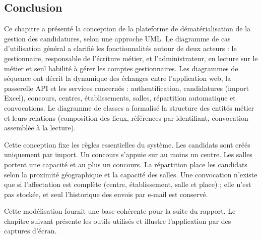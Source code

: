 \begin{onehalfspace}
\section{Conclusion}

Ce chapitre a présenté la conception de la plateforme de dématérialisation de la gestion des candidatures, selon une approche UML. Le diagramme de cas d'utilisation général a clarifié les fonctionnalités autour de deux acteurs : le gestionnaire, responsable de l'écriture métier, et l'administrateur, en lecture sur le métier et seul habilité à gérer les comptes gestionnaires. Les diagrammes de séquence ont décrit la dynamique des échanges entre l'application web, la passerelle API et les services concernés : authentification, candidatures (import Excel), concours, centres, établissements, salles, répartition automatique et convocations. Le diagramme de classes a formalisé la structure des entités métier et leurs relations (composition des lieux, références par identifiant, convocation assemblée à la lecture).

Cette conception fixe les règles essentielles du système. Les candidats sont créés uniquement par import. Un concours s'appuie sur au moins un centre. Les salles portent une capacité et au plus un concours. La répartition place les candidats selon la proximité géographique et la capacité des salles. Une convocation n'existe que si l'affectation est complète (centre, établissement, salle et place) ; elle n'est pas stockée, et seul l'historique des envois par e-mail est conservé.

Cette modélisation fournit une base cohérente pour la suite du rapport. Le chapitre suivant présente les outils utilisés et illustre l'application par des captures d'écran.

\end{onehalfspace}

